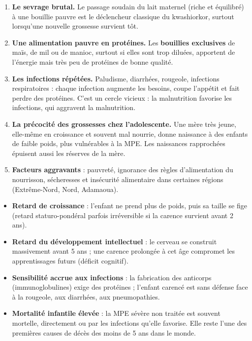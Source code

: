 \documentclass[11pt]{article}
\newcounter{popsec}
\newcounter{popsub}
\newcommand{\courssub}[1]{%
  \stepcounter{popsub}%
  \par\vspace{9pt}\noindent{\popxbold\fontsize{11.5}{13}\selectfont\color{popink}{\color{poporange}\thepopsec.\thepopsub}\hspace{6pt}#1}\par\nopagebreak\vspace{4pt}
}
\begin{document}
\begin{enumerate}
\item \textbf{Le sevrage brutal.} Le passage soudain du lait maternel (riche et équilibré) à une bouillie pauvre est le déclencheur classique du kwashiorkor, surtout lorsqu'une nouvelle grossesse survient tôt.
\item \textbf{Une alimentation pauvre en protéines.} Les \textbf{bouillies exclusives} de maïs, de mil ou de manioc, surtout si elles sont trop diluées, apportent de l'énergie mais très peu de protéines de bonne qualité.
\item \textbf{Les infections répétées.} Paludisme, diarrhées, rougeole, infections respiratoires : chaque infection augmente les besoins, coupe l'appétit et fait perdre des protéines. C'est un cercle vicieux : la malnutrition favorise les infections, qui aggravent la malnutrition.
\item \textbf{La précocité des grossesses chez l'adolescente.} Une mère très jeune, elle-même en croissance et souvent mal nourrie, donne naissance à des enfants de faible poids, plus vulnérables à la MPE. Les naissances rapprochées épuisent aussi les réserves de la mère.
\item \textbf{Facteurs aggravants} : pauvreté, ignorance des règles d'alimentation du nourrisson, sécheresses et insécurité alimentaire dans certaines régions (Extrême-Nord, Nord, Adamaoua).
\end{enumerate}

\courssub{Les conséquences de la MPE}

\begin{itemize}
\item \textbf{Retard de croissance} : l'enfant ne prend plus de poids, puis sa taille se fige (retard staturo-pondéral parfois irréversible si la carence survient avant 2 ans).
\item \textbf{Retard du développement intellectuel} : le cerveau se construit massivement avant 5 ans ; une carence prolongée à cet âge compromet les apprentissages futurs (déficit cognitif).
\item \textbf{Sensibilité accrue aux infections} : la fabrication des anticorps (immunoglobulines) exige des protéines ; l'enfant carencé est sans défense face à la rougeole, aux diarrhées, aux pneumopathies.
\item \textbf{Mortalité infantile élevée} : la MPE sévère non traitée est souvent mortelle, directement ou par les infections qu'elle favorise. Elle reste l'une des premières causes de décès des moins de 5 ans dans le monde.
\end{itemize}
\end{document}
